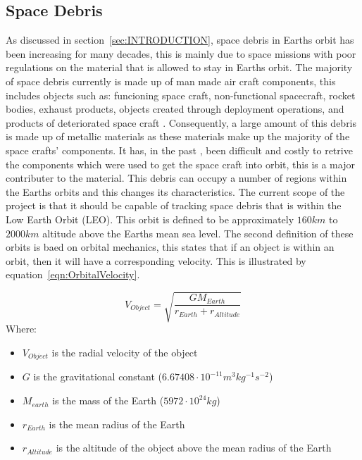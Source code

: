 \documentclass[11pt]{witseiepaper}
\begin{document}
\subsection{Space Debris} \label{sec:SpaceDebris}
As discussed in section~\ref{sec:INTRODUCTION}, space debris in Earths orbit has been increasing for many decades, this is mainly due to space missions with poor regulations on the material that is allowed to stay in Earths orbit.
The majority of space debris currently is made up of man made air craft components, this includes objects such as: funcioning space craft, non-functional spacecraft, rocket bodies, exhaust products, objects created through deployment operations, and products of deteriorated space craft \cite{OrbitalDebrisTechnicalAssessment}.
Consequently, a large amount of this debris is made up of metallic materials as these materials make up the majority of the space crafts' components.
It has, in the past \cite{Spacex}, been difficult and costly to retrive the components which were used to get the space craft into orbit, this is a major contributer to the material.
This debris can occupy a number of regions within the Earths orbits and this changes its characteristics.
The current scope of the project is that it should be capable of tracking space debris that is within the Low Earth Orbit (LEO). This orbit is defined to be approximately $160 km$ to $2000 km$ altitude above the Earths mean sea level.
The second definition of these orbits is baed on orbital mechanics, this states that if an object is within an orbit, then it will have a corresponding velocity.
This is illustrated by equation~\ref{eqn:OrbitalVelocity}. 

\begin{equation} \label{eqn:OrbitalVelocity}
    V_{Object} = \sqrt{\frac{G M_{Earth}}{r_{Earth} + r_{Altitude}}}
\end{equation}
Where:
\begin{itemize}
    \item $V_{Object}$ is the radial velocity of the object
    \item $G$ is the gravitational constant ($6.67408 \cdot 10^{-11} m^3 kg^{-1} s^{-2}$)
    \item $M_{earth}$ is the mass of the Earth ($5972 \cdot 10^{24} kg$)
    \item $r_{Earth}$ is the mean radius of the Earth
    \item $r_{Altitude}$ is the altitude of the object above the mean radius of the Earth
\end{itemize}
\end{document}
